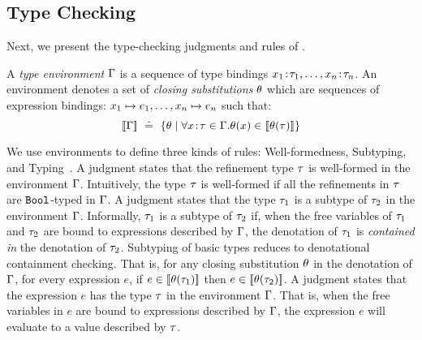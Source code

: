 \subsection{Type Checking}\label{subsec:typing}



Next, we present the type-checking judgments and rules of \undeclang. 

A \emph{type environment} $\Gamma$ is a sequence of type bindings 
${x_1\!:\!\tau_1},\ldots,{x_n\!:\!\tau_n}$. An environment
denotes a set of \emph{closing substitutions} $\theta$ which are 
sequences of expression bindings: 
${x_1} \mapsto {e_1}, \ldots, {x_n} \mapsto {e_n}$ such that:
$$
[\![\Gamma]\!] \ \doteq\   \{\theta \mid \forall {x\!:\!\ensuremath{\tau}} \in \Gamma. 
                                    \theta(x) \in [\![\theta(\tau)]\!] \}
$$

We use environments to define three kinds of
rules: Well-formedness, Subtyping, 
and Typing~\cite{Knowles10,GordonTOPLAS2011}.
%
A judgment \undeciswellformed{\Env}{\typ} states that 
the refinement type $\tau$ is well-formed in 
the environment $\Gamma$.
%
Intuitively, the type $\tau$ is well-formed if all
the refinements in $\tau$ are $\texttt{Bool}$-typed in $\Gamma$.
%
A judgment  states 
that the type $\tau_1$ is a subtype of %
$\tau_2$ in the environment $\Gamma$.
%
Informally, $\tau_1$ is a subtype of $\tau_2$ if, when 
the free variables of $\tau_1$ and $\tau_2$ 
are bound to expressions described by $\Gamma$,
the denotation of $\tau_1$ 
is \emph{contained in} the denotation of $\tau_2$. 
%
Subtyping of basic types reduces to denotational containment checking.
%
%
That is, for any closing substitution $\theta$
in the denotation of $\Gamma$, for every expression $e$, 
if $e \in [\![\theta(\tau_1)]\!]$ then 
$ e \in [\![\theta(\tau_2)]\!]$.
%
A judgment  states that
the expression $e$ has the type $\tau$ in 
the environment $\Gamma$.
That is, when the free variables in $e$ are 
bound to expressions described by $\Gamma$, the 
expression $e$ will evaluate to a value 
described by $\tau$.

